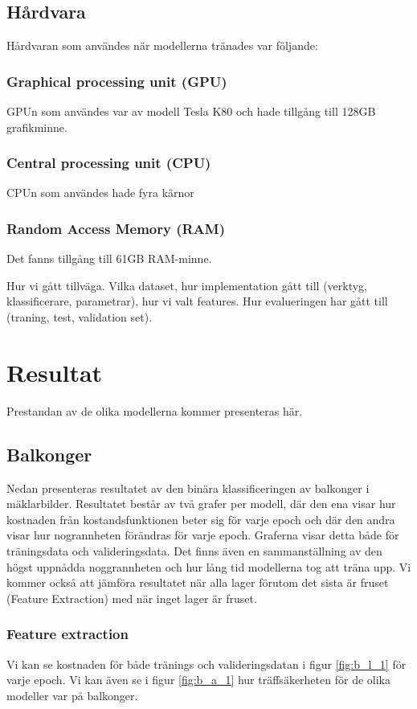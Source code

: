 \documentclass[]{kththesis}
\begin{document}
\section{Hårdvara}
Hårdvaran som användes när modellerna tränades var följande:

\subsection{Graphical processing unit (GPU)}
GPUn som användes var av modell Tesla K80 och hade tillgång till 128GB grafikminne.

\subsection{Central processing unit (CPU)}
CPUn som användes hade fyra kärnor 

\subsection{Random Access Memory (RAM)}
Det fanns tillgång till 61GB RAM-minne.


Hur vi gått tillväga. Vilka dataset, hur implementation gått till (verktyg, klassificerare, parametrar), hur vi valt features.
Hur evalueringen har gått till (traning, test, validation set).

\chapter{Resultat}
Prestandan av de olika modellerna kommer presenteras här.


\section{Balkonger}
Nedan presenteras resultatet av den binära klassificeringen av balkonger i mäklarbilder. 
Resultatet består av två grafer per modell, där den ena visar hur kostnaden från kostandsfunktionen beter sig för varje epoch och där den andra visar hur nogrannheten förändras för varje epoch.
Graferna visar detta både för träningsdata och valideringsdata.
Det finns även en sammanställning av den högst uppnådda noggrannheten och hur lång tid modellerna tog att träna upp. 
Vi kommer också att jämföra resultatet när alla lager förutom det sista är fruset (Feature Extraction) med när inget lager är fruset.


\subsection{Feature extraction}
Vi kan se kostnaden för både tränings och valideringsdatan i figur \ref{fig:b_l_1} för varje epoch. Vi kan även se i figur \ref{fig:b_a_1} hur träffsäkerheten för de olika modeller var på balkonger.
\end{document}
